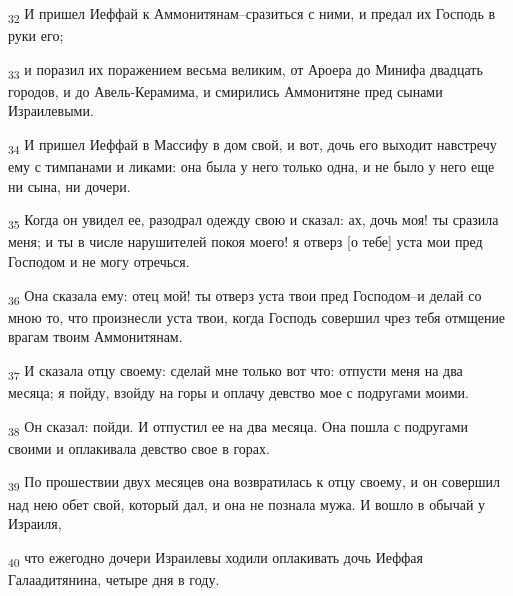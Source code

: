 \begin{tcolorbox}
\textsubscript{32} И пришел Иеффай к Аммонитянам--сразиться с ними, и предал их Господь в руки его;
\end{tcolorbox}
\begin{tcolorbox}
\textsubscript{33} и поразил их поражением весьма великим, от Ароера до Минифа двадцать городов, и до Авель-Керамима, и смирились Аммонитяне пред сынами Израилевыми.
\end{tcolorbox}
\begin{tcolorbox}
\textsubscript{34} И пришел Иеффай в Массифу в дом свой, и вот, дочь его выходит навстречу ему с тимпанами и ликами: она была у него только одна, и не было у него еще ни сына, ни дочери.
\end{tcolorbox}
\begin{tcolorbox}
\textsubscript{35} Когда он увидел ее, разодрал одежду свою и сказал: ах, дочь моя! ты сразила меня; и ты в числе нарушителей покоя моего! я отверз [о тебе] уста мои пред Господом и не могу отречься.
\end{tcolorbox}
\begin{tcolorbox}
\textsubscript{36} Она сказала ему: отец мой! ты отверз уста твои пред Господом--и делай со мною то, что произнесли уста твои, когда Господь совершил чрез тебя отмщение врагам твоим Аммонитянам.
\end{tcolorbox}
\begin{tcolorbox}
\textsubscript{37} И сказала отцу своему: сделай мне только вот что: отпусти меня на два месяца; я пойду, взойду на горы и оплачу девство мое с подругами моими.
\end{tcolorbox}
\begin{tcolorbox}
\textsubscript{38} Он сказал: пойди. И отпустил ее на два месяца. Она пошла с подругами своими и оплакивала девство свое в горах.
\end{tcolorbox}
\begin{tcolorbox}
\textsubscript{39} По прошествии двух месяцев она возвратилась к отцу своему, и он совершил над нею обет свой, который дал, и она не познала мужа. И вошло в обычай у Израиля,
\end{tcolorbox}
\begin{tcolorbox}
\textsubscript{40} что ежегодно дочери Израилевы ходили оплакивать дочь Иеффая Галаадитянина, четыре дня в году.
\end{tcolorbox}

